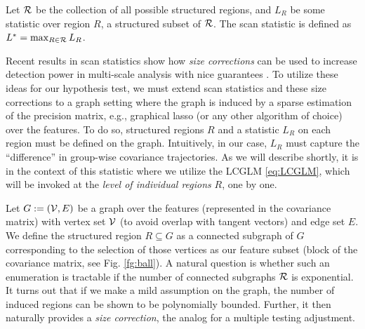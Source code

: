 \begin{definition} Let $\mathcal{R}$ be the collection of all possible structured regions, and $L_R$ be some statistic over region $R$, a structured subset of $\mathcal{R}$. The scan statistic is defined as $L^* = \max_{R\in\mathcal{R}} L_R$.
\end{definition}
Recent results in scan statistics show how \textit{size corrections} can be used to increase detection power in multi-scale analysis with 
nice guarantees \citep{walther2010optimal,wang2016structured}. 
%
To utilize these ideas for our hypothesis test, we must extend scan statistics and these size corrections to a graph setting 
where the graph is induced by a sparse estimation of the precision matrix, e.g., graphical lasso (or any other algorithm of choice) over the features.
To do so, structured regions $R$ and a statistic $L_R$ on each region must be defined on the graph. Intuitively, in our case, 
$L_R$ must capture the ``difference'' in group-wise covariance trajectories. 
As we will describe shortly, it is in the context of this statistic where we utilize the LCGLM \eqref{eq:LCGLM}, which will be invoked at the {\em level of individual regions} $R$, one by one. 

Let $G:=(\mathcal{V},E)$ be a graph over the features (represented in the covariance matrix) with vertex set $\mathcal{V}$ (to avoid overlap with tangent vectors) and edge set $E$. 
We define the structured region $R \subseteq G$ as a connected subgraph of $G$ corresponding to the 
selection of those vertices as our feature subset (block of the covariance matrix, see Fig. \ref{fg:ball}). 
A natural question is whether such an enumeration is tractable 
if the number of connected subgraphs $\mathcal{R}$ is exponential. It turns out that if we make a mild assumption on the graph, 
the number of induced regions can be shown to be polynomially bounded. Further, it then naturally provides a {\em size correction}, the analog for a multiple testing adjustment. 

